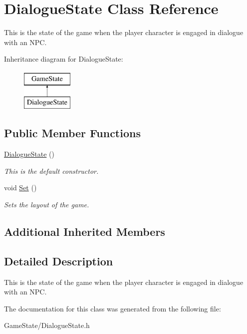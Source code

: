 \hypertarget{classDialogueState}{\section{Dialogue\-State Class Reference}
\label{classDialogueState}
}


This is the state of the game when the player character is engaged in dialogue with an N\-P\-C.  


Inheritance diagram for Dialogue\-State\-:\begin{figure}[H]
\begin{center}
\leavevmode
\includegraphics[height=2.000000cm]{classDialogueState}
\end{center}
\end{figure}
\subsection*{Public Member Functions}
\begin{DoxyCompactItemize}
\item 
\hypertarget{classDialogueState_a622d0916c1329a5e13675e4d7aff3b79}{\hyperlink{classDialogueState_a622d0916c1329a5e13675e4d7aff3b79}{Dialogue\-State} ()}\label{classDialogueState_a622d0916c1329a5e13675e4d7aff3b79}

\begin{DoxyCompactList}\small\item\em This is the default constructor. \end{DoxyCompactList}\item 
\hypertarget{classDialogueState_a203e463dc924a2492db74b749b81b9f1}{void \hyperlink{classDialogueState_a203e463dc924a2492db74b749b81b9f1}{Set} ()}\label{classDialogueState_a203e463dc924a2492db74b749b81b9f1}

\begin{DoxyCompactList}\small\item\em Sets the layout of the game. \end{DoxyCompactList}\end{DoxyCompactItemize}
\subsection*{Additional Inherited Members}


\subsection{Detailed Description}
This is the state of the game when the player character is engaged in dialogue with an N\-P\-C. 

The documentation for this class was generated from the following file\-:\begin{DoxyCompactItemize}
\item 
Game\-State/Dialogue\-State.\-h\end{DoxyCompactItemize}

